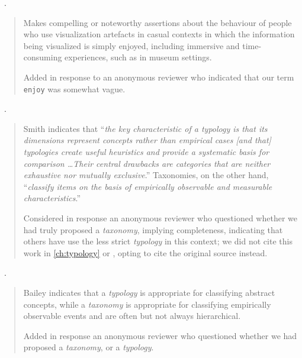 \begin{sloppypar}
~\cite{Pousman2007}. \end{sloppypar}

\begin{quotation}
    Makes compelling or noteworthy assertions about the behaviour of people who use visualization artefacts in casual contexts in which the information being visualized is simply enjoyed,  including immersive and time-consuming experiences, such as in museum settings.
    
    Added in response to an anonymous reviewer who indicated that our term {\tt enjoy} was somewhat vague.
\end{quotation}

\begin{sloppypar}
~\cite{Smith2002}. \end{sloppypar}

\begin{quotation}
    Smith indicates that ``{\it the key characteristic of a typology is that its dimensions represent concepts rather than empirical cases [and that] typologies create useful heuristics and provide a systematic basis for comparison \ldots Their central drawbacks are categories that are neither exhaustive nor mutually exclusive}.''
    Taxonomies, on the other hand, ``{\it classify items on the basis of empirically observable and measurable characteristics}.''

    Considered in response an anonymous reviewer who questioned whether we had truly proposed a {\it taxonomy}, implying completeness, indicating that others have use the less strict {\it typology} in this context; we did not cite this work in \autoref{ch:typology} or \citet{Brehmer2013}, opting to cite the original source  \citet{Bailey1994} instead.
\end{quotation}

\begin{sloppypar}
~\cite{Bailey1994}. \end{sloppypar}

\begin{quotation}
    Bailey indicates that a {\it typology} is appropriate for classifying abstract concepts, while a {\it taxonomy} is appropriate for classifying empirically observable events and are often but not always hierarchical.

    Added in response an anonymous reviewer who questioned whether we had proposed a {\it taxonomy}, or a {\it typology}.
\end{quotation}

